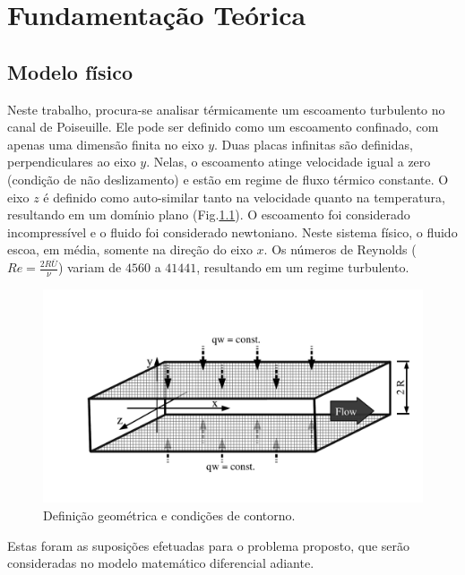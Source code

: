 \chapter[Fundamentação Teórica]{Fundamentação Teórica}


\section{Modelo físico}

Neste trabalho, procura-se analisar térmicamente um escoamento turbulento no canal de Poiseuille. Ele pode ser definido como um escoamento confinado, com apenas uma dimensão finita no eixo $y$. Duas placas infinitas são definidas, perpendiculares ao eixo $y$. Nelas, o escoamento atinge velocidade igual a zero (condição de não deslizamento) e estão em regime de fluxo térmico constante. O eixo $z$ é definido como auto-similar tanto na velocidade quanto na temperatura, resultando em um domínio plano (Fig.\ref{descricaoGeometrica}). O escoamento foi considerado incompressível e o fluido foi considerado newtoniano. Neste sistema físico, o fluido escoa, em média, somente na direção do eixo $x$.
Os números de Reynolds ($Re = \frac{2R \overline{U}}{\nu}$) variam de $4560$ a $41441$, resultando em um regime turbulento.

\begin{figure}[h!]
	\centering
	\includegraphics[angle=0, trim={0mm 23mm 0mm 35mm}, clip , scale=0.42]{cap_fundamentacao/canal1.pdf}
	\caption{Definição geométrica e condições de contorno.}
	\label{descricaoGeometrica}
\end{figure}

Estas foram as suposições efetuadas para o problema proposto, que serão consideradas no modelo matemático diferencial adiante.

